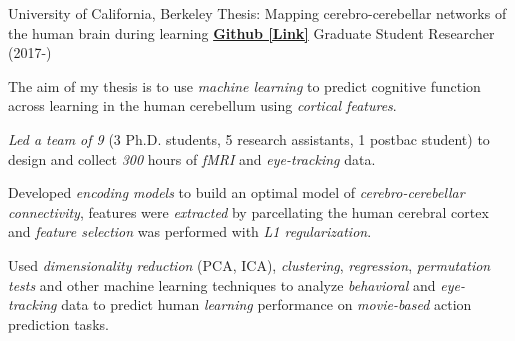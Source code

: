

\begin{cventries}

  \cventry
    {University of California, Berkeley} %
    {Thesis: Mapping cerebro-cerebellar networks of the human brain during learning}
    {\href{https://github.com/maedbhk/cerebellum_learning_connect}{\textbf{Github [Link]}}}
    {Graduate Student Researcher (2017-)} %
    {
      \begin{cvitems} %
        \item {The aim of my thesis is to use \textit{machine learning} to predict cognitive function across learning in the human cerebellum using \textit{cortical features}.} 
        \item {\textit{Led a team of 9} (3 Ph.D. students, 5 research assistants, 1 postbac student) to design and collect \textit{300} hours of \textit{fMRI} and \textit{eye-tracking} data.}
        \item {Developed \textit{encoding models} to build an optimal model of \textit{cerebro-cerebellar connectivity}, features were \textit{extracted} by parcellating the human cerebral cortex and \textit{feature selection} was performed with \textit{L1 regularization}.}
        \item {Used \textit{dimensionality reduction} (PCA, ICA), \textit{clustering}, \textit{regression}, \textit{permutation tests} and other machine learning techniques to analyze \textit{behavioral} and \textit{eye-tracking} data to predict human \textit{learning} performance on \textit{movie-based} action prediction tasks.}
      \end{cvitems}
    }
    

\end{cventries}
